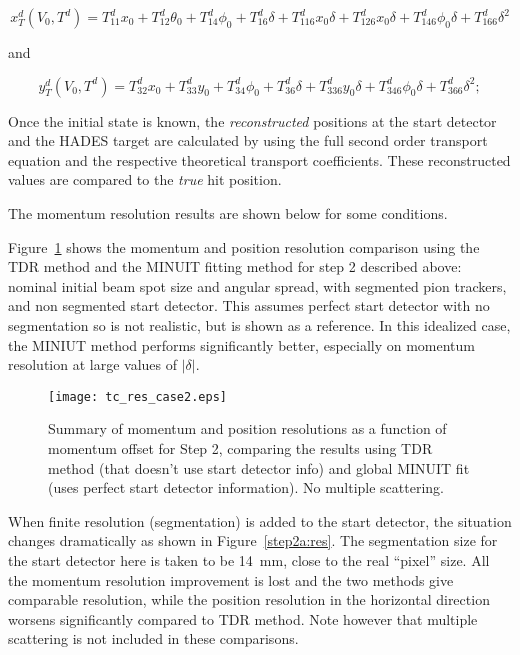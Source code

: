 \documentclass[20]{article}
\begin{document}
\begin{equation}
  x^{d}_{T}(V_0, T^{d}) = T^{d}_{11} x_0 + T^{d}_{12}  \theta_0 + T^{d}_{14}  \phi_0 + T^{d}_{16}  \delta + T^{d}_{116}  x_0\delta + T^{d}_{126}  x_{0}\delta + T^{d}_{146}  \phi_0\delta + T^{d}_{166} \delta^2
\end{equation}

and 

\begin{equation}
  y^{d}_{T}(V_0, T^{d}) = T^{d}_{32}x_{0} + T^{d}_{33}y_{0} + T^{d}_{34}\phi_{0} + T^d_{36}\delta + T^d_{336}y_0\delta + T^d_{346}\phi_0\delta + T^d_{366}\delta^2;
\end{equation}


Once the initial state is known, the \emph{reconstructed} positions
at the start detector and the HADES target are calculated by using the
full second order transport equation and the respective theoretical
transport coefficients. These reconstructed values are compared to the
\emph{true} hit position.

The momentum resolution results are shown below for some
conditions.

Figure~\ref{step2bis:res} shows the momentum and position resolution
comparison using the TDR method and the MINUIT fitting method for step
2 described above: nominal initial beam spot size and angular spread,
with segmented pion trackers, and non segmented start detector. This
assumes perfect start detector with no segmentation so is not
realistic, but is shown as a reference. In this idealized case, the
MINIUT method performs significantly better, especially on momentum
resolution at large values of $|\delta|$.

\begin{figure}[tbp]
  \texttt{[image: tc\_res\_case2.eps]}
  \caption{Summary of momentum and position resolutions as a function
    of momentum offset for Step 2, comparing the results using TDR
    method (that doesn't use start detector info) and global MINUIT
    fit (uses perfect start detector information). No multiple scattering. }
  \label {step2bis:res}
\end{figure}

When finite resolution (segmentation) is added to the start detector,
the situation changes dramatically as shown in
Figure~\ref{step2a:res}. The segmentation size for the start detector
here is taken to be 14~mm, close to the real ``pixel'' size. All the
momentum resolution improvement is lost and the two methods give
comparable resolution, while the position resolution in the horizontal
direction worsens significantly compared to TDR method. Note however
that multiple scattering is not included in these comparisons.
\end{document}
